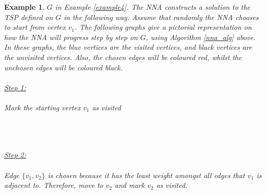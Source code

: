 \documentclass[12pt]{article}
\newtheorem{example}[definition]{Example}
\numberwithin{equation}{subsection}
\numberwithin{table}{subsection}
\numberwithin{algorithm}{subsection}
\begin{document}
\begin{example}
\label{example_nna_explanation}
 $G$ in Example \ref{example4}. The NNA constructs a solution to the TSP defined on $G$ in the following way. Assume that randomly the NNA chooses to start from vertex $v_1$. The following graphs give a pictorial representation on how the NNA will progress step by step on $G$, using Algorithm \ref{nna_alg} above. In these graphs, the blue vertices are the visited vertices, and black vertices are the unvisited vertices. Also, the chosen edges will be coloured red, whilst the unchosen edges will be coloured black.\\\\
\underline{Step 1:}\\\\
Mark the starting vertex $v_1$ as visited\\\\
\\\\
\underline{Step 2:}\\\\
Edge $\{v_1, v_2\}$ is chosen because it has the least weight amongst all edges that $v_1$ is adjacent to. Therefore, move to $v_2$ and mark $v_2$ as visited.\\\\
\end{example}
\end{document}

